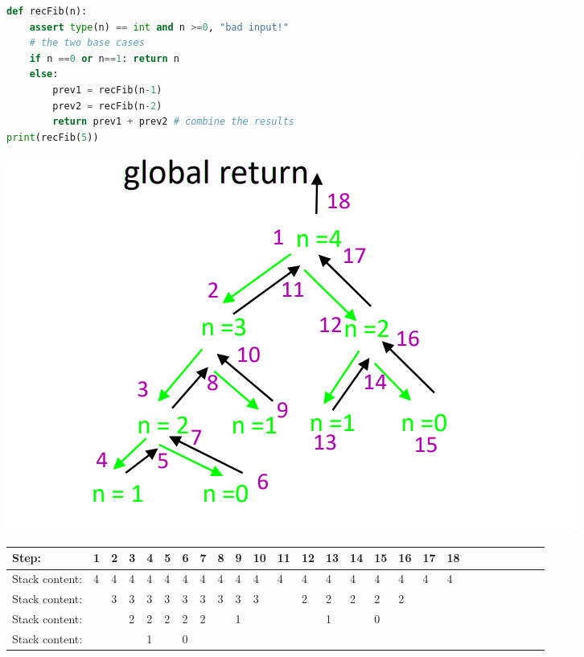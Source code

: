 \documentclass[12pt,oneside]{book}
\begin{document}
\begin{minipage}{0.6\linewidth}
	\begin{lstlisting}[language=python]
def recFib(n):
    assert type(n) == int and n >=0, "bad input!"
    # the two base cases 
    if n ==0 or n==1: return n 
    else:
        prev1 = recFib(n-1)
        prev2 = recFib(n-2)
        return prev1 + prev2 # combine the results 
print(recFib(5))
\end{lstlisting}
\end{minipage}
\begin{minipage}{0.4\linewidth}
	\includegraphics[width=\linewidth]{../pic/python/8}
\end{minipage}
\begin{tabular}{|l|l|l|l|l|l|l|l|l|l|l|l|l|l|l|l|l|l|l|l|l|l|l|l|l|l|}
	\hline
	Step:          & 1 & 2 & 3 & 4 & 5 & 6 & 7 & 8 & 9 & 10 & 11 & 12 & 13 & 14 & 15 & 16 & 17 & 18 \\ \hline
	Stack content: & 4 & 4 & 4 & 4 & 4 & 4 & 4 & 4 & 4 & 4  & 4  & 4  & 4  & 4  & 4  & 4  & 4  & 4  \\ \hline
	Stack content: &   & 3 & 3 & 3 & 3 & 3 & 3 & 3 & 3 & 3  &    & 2  & 2  & 2  & 2  & 2  &    &    \\ \hline
	Stack content: &   &   & 2 & 2 & 2 & 2 & 2 &   & 1 &    &    &    & 1  &    & 0  &    &    &    \\ \hline
	Stack content: &   &   &   & 1 &   & 0 &   &   &   &    &    &    &    &    &    &    &    &    \\ \hline
\end{tabular}\\
\end{document}
